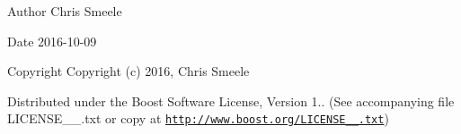 \begin{DoxyAuthor}{Author}
Chris Smeele 
\end{DoxyAuthor}
\begin{DoxyDate}{Date}
2016-\/10-\/09 
\end{DoxyDate}
\begin{DoxyCopyright}{Copyright}
Copyright (c) 2016, Chris Smeele
\end{DoxyCopyright}
Distributed under the Boost Software License, Version 1.. (See accompanying file L\+I\+C\+E\+N\+S\+E\+\_\+\_.\+txt or copy at \href{http://www.boost.org/LICENSE_1_0.txt}{\tt http\+://www.\+boost.\+org/\+L\+I\+C\+E\+N\+S\+E\+\_\+\_.\+txt}) 